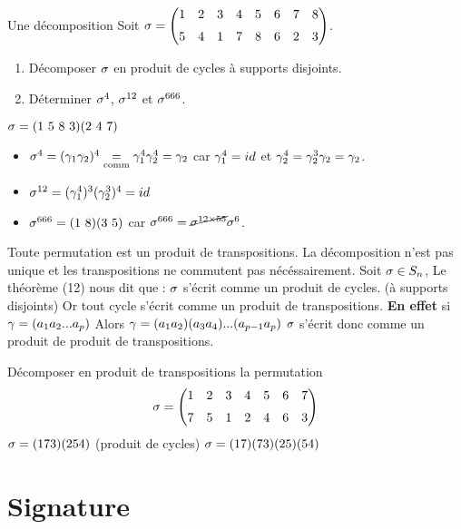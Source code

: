 \documentclass[11pt]{article}
\begin{document}
\begin{ex}{Une décomposition}{}
    Soit $\s=\begin{pmatrix}1&2&3&4&5&6&7&8\n5&4&1&7&8&6&2&3\end{pmatrix}$.\n
    \begin{enumerate}
        \item Décomposer $\sigma$ en produit de cycles à supports disjoints.
        \item Déterminer $\sigma^4$, $\sigma^{12}$ et $\sigma^{666}$.
    \end{enumerate}
    \tcblower
     $\sigma=(1~5~8~3)(2~4~7)$\n
     \begin{itemize}
        \item $\sigma^4=(\gamma_1\gamma_2)^4\underset{\text{comm}}{=}\gamma_1^4\gamma_2^4=\gamma_2$ car $\gamma_1^4=id$ et $\gamma_2^4=\gamma_2^3\gamma_2=\gamma_2$.
        \item $\sigma^{12}=(\gamma_1^{4})^3(\gamma_2^3)^4=id$
        \item $\sigma^{666}=(1~8)(3~5)$ car $\sigma^{666}=\cancel{\sigma^{12\times55}}\sigma^6$.
    \end{itemize}
\end{ex}

\begin{corr}{}{}
    Toute permutation est un produit de transpositions.\n
    La décomposition n'est pas unique et les transpositions ne commutent pas nécéssairement.
    \tcblower
    Soit $\sigma \in S_{n}$, \n 
    Le théorème (12) nous dit que : $\sigma$ s'écrit comme un produit de cycles. (à supports disjoints)\n
    Or tout cycle s'écrit comme un produit de transpositions.\n
    \textbf{En effet} si \n
    $\gamma = (a_{1} a_{2}  ...  a_{p})$\n
    Alors $\gamma = (a_{1} a_{2})(a_{3} a_{4}) ... (a_{p-1} a_{p})$\n
    $\sigma$ s'écrit donc comme un produit de produit de transpositions.
\end{corr}

\begin{ex}{}{}
    Décomposer en produit de transpositions la permutation \n
    \begin{equation*}
        \s = \begin{pmatrix}
            1 & 2 & 3 & 4 & 5 & 6 & 7 \n
            7 & 5 & 1 & 2 & 4 & 6 & 3
        \end{pmatrix}
    \end{equation*}
    \tcblower
    $\sigma = (1 7 3) (2 5 4)$ (produit de cycles)\n
    $\sigma = (1 7)(7 3)(2 5)(5 4)$
\end{ex}

\section{Signature}
\end{document}
